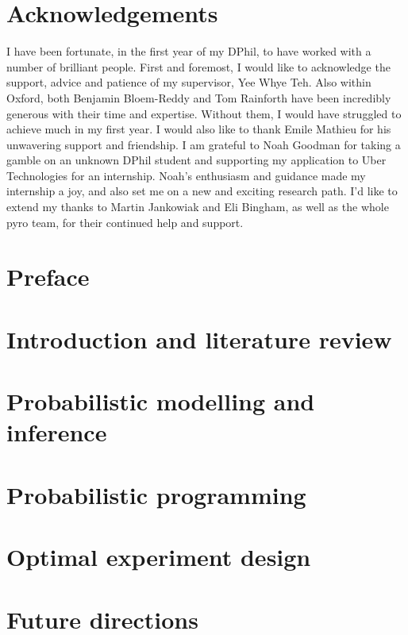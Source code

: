 \documentclass[a4paper, 10pt]{report} %
\theoremstyle{plain}
\theoremstyle{definition}
\theoremstyle{remark}
\begin{document}
	
	
	
	\tableofcontents
	
\newpage
	\chapter*{Acknowledgements}
	I have been fortunate, in the first year of my DPhil, to have worked with a number of brilliant people. First and foremost, I would like to acknowledge the support, advice and patience of my supervisor, Yee Whye Teh. Also within Oxford, both Benjamin Bloem-Reddy and Tom Rainforth have been incredibly generous with their time and expertise. Without them, I would have struggled to achieve much in my first year. I would also like to thank Emile Mathieu for his unwavering support and friendship. I am grateful to Noah Goodman for taking a gamble on an unknown DPhil student and supporting my application to Uber Technologies for an internship. Noah's enthusiasm and guidance made my internship a joy, and also set me on a new and exciting research path. I'd like to extend my thanks to Martin Jankowiak and Eli Bingham, as well as the whole pyro team, for their continued help and support.
	
	
	
	\chapter*{Preface}
	\label{chap:preface}
	
	
	\chapter{Introduction and literature review}
	\label{chap:intro}
	
	
	\chapter{Probabilistic modelling and inference}
	\label{chap:probabilistic_modelling}
	
	
	\chapter{Probabilistic programming}
	\label{chap:ppl}
	
	
	\chapter{Optimal experiment design}
	\label{chap:oed}
	
	
	\chapter{Future directions}
	\label{chap:future}
	
	
	
	\clearpage %
	
	
	
	
\end{document}
